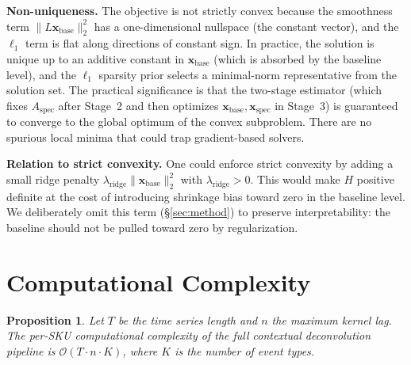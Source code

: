 \documentclass[10pt]{article} %
\theoremstyle{plain}
\newtheorem{proposition}{Proposition}
\theoremstyle{definition}
\newcommand{\xbase}{\mathbf{x}_{\text{base}}}
\newcommand{\xspec}{\mathbf{x}_{\text{spec}}}
\newcommand{\Aspec}{A_{\text{spec}}}
\begin{document}
\textbf{Non-uniqueness.} The objective is not strictly convex because the smoothness term $\|L \xbase\|_2^2$ has a one-dimensional nullspace (the constant vector), and the $\ell_1$ term is flat along directions of constant sign. In practice, the solution is unique up to an additive constant in $\xbase$ (which is absorbed by the baseline level), and the $\ell_1$ sparsity prior selects a minimal-norm representative from the solution set. The practical significance is that the two-stage estimator (which fixes $\Aspec$ after Stage~2 and then optimizes $\xbase, \xspec$ in Stage~3) is guaranteed to converge to the global optimum of the convex subproblem. There are no spurious local minima that could trap gradient-based solvers.

\textbf{Relation to strict convexity.} One could enforce strict convexity by adding a small ridge penalty $\lambda_{\text{ridge}} \|\xbase\|_2^2$ with $\lambda_{\text{ridge}} > 0$. This would make $H$ positive definite at the cost of introducing shrinkage bias toward zero in the baseline level. We deliberately omit this term (\S\ref{sec:method}) to preserve interpretability: the baseline should not be pulled toward zero by regularization.


\section{Computational Complexity}
\label{app:complexity}

\begin{proposition}
Let $T$ be the time series length and $n$ the maximum kernel lag. The per-SKU computational complexity of the full contextual deconvolution pipeline is $\mathcal{O}(T \cdot n \cdot K)$, where $K$ is the number of event types.
\end{proposition}
\end{document}
